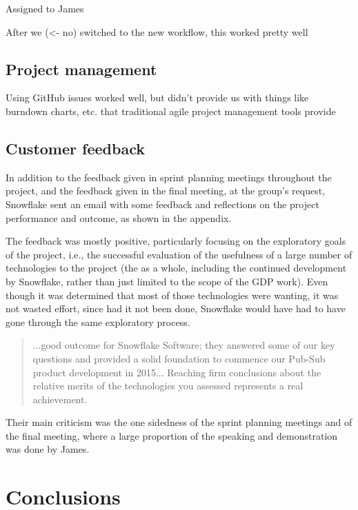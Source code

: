 \documentclass[a4paper, 12pt, twoside]{article}
\begin{document}
Assigned to James

After we (<- no) switched to the new workflow, this worked pretty well

\subsection{Project management}
\label{sec:eval_project_management}

Using GitHub issues worked well, but didn't provide us with things like burndown charts, etc. that traditional agile project management tools provide

\subsection{Customer feedback}
\label{sec:eval_customer_feedback}

In addition to the feedback given in sprint planning meetings throughout the project, and the feedback given in the final meeting, at the group's request, Snowflake sent an email with some feedback and reflections on the project performance and outcome, as shown in the appendix.

The feedback was mostly positive, particularly focusing on the exploratory goals of the project, i.e., the successful evaluation of the usefulness of a large number of technologies to the project (the as a whole, including the continued development by Snowflake, rather than just limited to the scope of the GDP work). Even though it was determined that most of those technologies were wanting, it was not wasted effort, since had it not been done, Snowflake would have had to have gone through the same exploratory process.

\blockquote{...good outcome for Snowflake Software; they answered some of our key questions and provided a solid foundation to commence our Pub-Sub product development in 2015... Reaching firm conclusions about the relative merits of the technologies you assessed represents a real achievement.}

Their main criticism was the one sidedness of the sprint planning meetings and of the final meeting, where a large proportion of the speaking and demonstration was done by James.

\section{Conclusions}
\label{sec:conclusions}

\newpage
\end{document}
